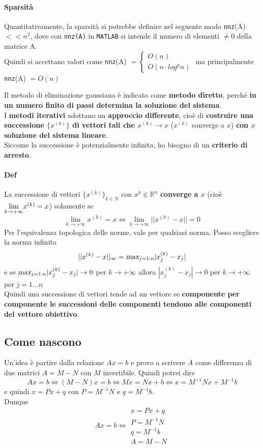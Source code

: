 \documentclass[10pt]{book}
\begin{document}
\paragraph{Sparsità} Quantitativamente, la sparsità si potrebbe definire nel seguente modo \texttt{nnz}(A) $<< n^2$, dove con \texttt{nnz(A)} in \texttt{MATLAB} si intende il numero di elementi $\neq 0$ della matrice A.\\
Quindi si accettano valori come \texttt{nnz}(A) $= \left\{ \begin{array}{l}O(n) \\ O(n\cdot log^p n) \end{array} \right. $ ma principalmente \texttt{nnz}(A) $= O(n)$
\pagebreak

Il metodo di eliminazione gaussiana è indicato come \textbf{metodo diretto}, perché \textbf{in un numero finito di passi determina la soluzione del sistema}.\\
I \textbf{metodi iterativi} adottano un \textbf{approccio differente}, cioè di \textbf{costruire una successione $\{x^{(k)}\}$ di vettori tali che $x^{(k)} \rightarrow x$} ($x^{(k)}$ converge a $x$) \textbf{con $x$ soluzione del sistema lineare}.\\
Siccome la successione è potenzialmente infinita, ho bisogno di un \textbf{criterio di arresto}.
\paragraph{Def} La successione di vettori $\{x^{(k)}\}_{k\in N}$ con $x^{k} \in \mathbb{R}^n$ \textbf{converge a $x$} (cioè $\mathlarger{\lim_{k\to +\infty}} x^{(k)} = x$) solamente se
$$\lim_{k\to +\infty} x^{(k)} = x \Leftrightarrow \lim_{k\to +\infty} ||x^{(k)} - x|| = 0$$
Per l'equivalenza topologica delle norme, vale per qualsiasi norma. Posso scegliere la norma infinito 
$$||x^{(k)} - x||_\infty = \textsl{max}_{j=1:n}|x_j^{(k)} - x_j|$$
e se $\textsl{max}_{j=1:n}|x_j^{(k)} - x_j| \rightarrow 0$ per $k \rightarrow +\infty$ allora $|x_j^{(k)} - x_j| \rightarrow 0$ per $k \rightarrow +\infty$ per $j = 1\ldots n$\\
Quindi una successione di vettori tende ad un vettore se \textbf{componente per componente le successioni delle componenti tendono alle componenti del vettore obiettivo}.
\subsection{Come nascono}
Un'idea è partire dalla relazione $Ax = b$ e provo a scrivere $A$ come differenza di due matrici $A = M - N$ con $M$ invertibile. Quindi potrei dire $$Ax = b \Leftrightarrow (M - N)x = b \Leftrightarrow Mx = Nx + b \Leftrightarrow x = M^{-1}Nx + M^{-1}b$$ e quindi $x = Px + q$ con $P = M^{-1}N$ e $q = M^{-1}b$.\\
Dunque $$Ax = b \Leftrightarrow \begin{array}{l}
x = Px + q \\
P = M^{-1}N\\q = M^{-1}b\\
A = M - N
\end{array}$$
\end{document}
